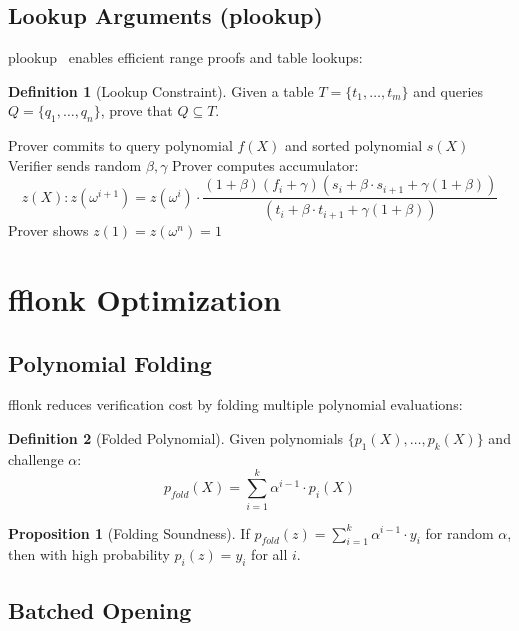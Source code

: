 \documentclass[11pt,a4paper]{article}
\theoremstyle{definition}
\newtheorem{definition}{Definition}
\newtheorem{proposition}{Proposition}
\begin{document}
\subsection{Lookup Arguments (plookup)}

plookup~\cite{plookup} enables efficient range proofs and table lookups:

\begin{definition}[Lookup Constraint]
    Given a table $T = \{t_1, \ldots, t_m\}$ and queries $Q = \{q_1, \ldots, q_n\}$, prove that $Q \subseteq T$.
\end{definition}

\begin{algorithm}
\caption{plookup Protocol}
\begin{algorithmic}[1]
\State Prover commits to query polynomial $f(X)$ and sorted polynomial $s(X)$
\State Verifier sends random $\beta, \gamma$
\State Prover computes accumulator:
\[
z(X) : z(\omega^{i+1}) = z(\omega^i) \cdot \frac{(1 + \beta)(f_i + \gamma)(s_i + \beta \cdot s_{i+1} + \gamma(1+\beta))}{(t_i + \beta \cdot t_{i+1} + \gamma(1+\beta))}
\]
\State Prover shows $z(1) = z(\omega^n) = 1$
\end{algorithmic}
\end{algorithm}

\section{fflonk Optimization}

\subsection{Polynomial Folding}

fflonk reduces verification cost by folding multiple polynomial evaluations:

\begin{definition}[Folded Polynomial]
    Given polynomials $\{p_1(X), \ldots, p_k(X)\}$ and challenge $\alpha$:
    \[
    p_{fold}(X) = \sum_{i=1}^{k} \alpha^{i-1} \cdot p_i(X)
    \]
\end{definition}

\begin{proposition}[Folding Soundness]
    If $p_{fold}(z) = \sum_{i=1}^{k} \alpha^{i-1} \cdot y_i$ for random $\alpha$, then with high probability $p_i(z) = y_i$ for all $i$.
\end{proposition}

\subsection{Batched Opening}
\end{document}
